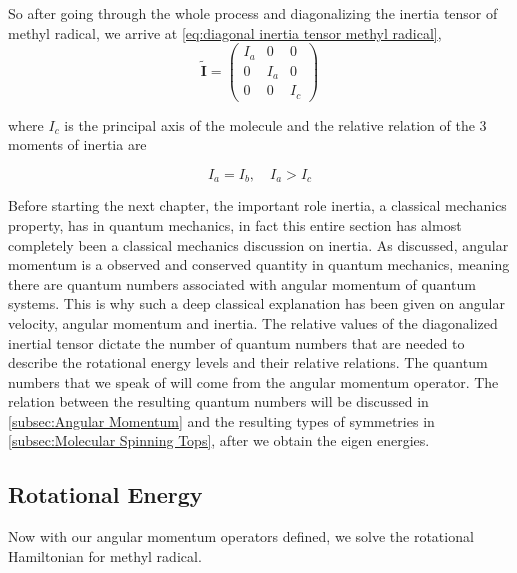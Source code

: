 \documentclass[11pt,a4paper]{book}
\begin{document}
			So after going through the whole process and diagonalizing the inertia tensor of methyl radical, we arrive at \autoref{eq:diagonal inertia tensor methyl radical},
			\begin{equation}
				\label{eq:diagonal inertia tensor methyl radical}
				\tilde{\textbf{I}}= 
					\begin{pmatrix}
						I_{a} & 0 & 0\\
						0 & I_{a} & 0\\
						0 & 0 & I_{c}
					\end{pmatrix}
			\end{equation}
			
			\noindent where $I_c$ is the principal axis of the molecule and the relative relation of the 3 moments of inertia are
			
			\begin{equation}
				\label{eq:inertia tensor elements of methyl radical}
					I_a = I_b, \quad I_a > I_c
			\end{equation}
			
			Before starting the next chapter, the important role inertia, a classical mechanics property, has in quantum mechanics, in fact this entire section has almost completely been a classical mechanics discussion on inertia. As discussed, angular momentum is a observed and conserved quantity in quantum mechanics, meaning there are quantum numbers associated with angular momentum  of quantum systems. This is why such a deep classical explanation has been given on angular velocity, angular momentum and inertia. The relative values of the diagonalized inertial tensor dictate the number of quantum numbers that are needed to describe the rotational energy levels and their relative relations. The quantum numbers that we speak of will come from the angular momentum operator. The relation between the resulting quantum numbers will be discussed in \autoref{subsec:Angular Momentum} and the resulting types of symmetries in \autoref{subsec:Molecular Spinning Tops}, after we obtain the eigen energies.
		
			
		\subsection{Rotational Energy}
			\label{subsec:Vibrational Quantum Number}
			Now with our angular momentum operators defined, we solve the rotational Hamiltonian for methyl radical.
			
\end{document}
